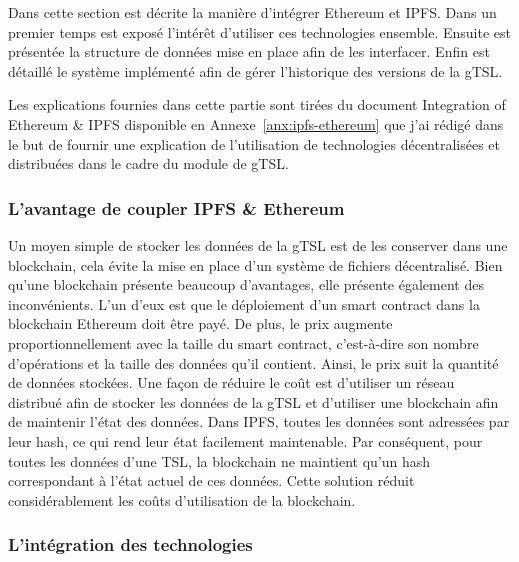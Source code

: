\documentclass{tnreport}
\begin{document}
Dans cette section est décrite la manière d'intégrer Ethereum et IPFS. Dans un premier temps est exposé l'intérêt d'utiliser ces technologies ensemble. Ensuite est présentée la structure de données mise en place afin de les interfacer. Enfin est détaillé le système implémenté afin de gérer l'historique des versions de la gTSL.

Les explications fournies dans cette partie sont tirées du document Integration of Ethereum \& IPFS disponible en Annexe~\ref{anx:ipfs-ethereum} que j'ai rédigé dans le but de fournir une explication de l'utilisation de technologies décentralisées et distribuées dans le cadre du module de gTSL.

\subsubsection{L'avantage de coupler IPFS \& Ethereum}

Un moyen simple de stocker les données de la gTSL est de les conserver dans une blockchain, cela évite la mise en place d'un système de fichiers décentralisé. 
Bien qu'une blockchain présente beaucoup d'avantages, elle présente également des inconvénients.
L'un d'eux est que le déploiement d'un smart contract dans la blockchain Ethereum doit être payé.
De plus, le prix augmente proportionnellement avec la taille du smart contract, c'est-à-dire son nombre d'opérations et la taille des données qu'il contient.
Ainsi, le prix suit la quantité de données stockées.
Une façon de réduire le coût est d'utiliser un réseau distribué afin de stocker les données de la gTSL et d'utiliser une blockchain afin de maintenir l'état des données.
Dans IPFS, toutes les données sont adressées par leur hash, ce qui rend leur état facilement maintenable. Par conséquent, pour toutes les données d'une TSL, la blockchain ne maintient qu'un hash correspondant à l'état actuel de ces données. Cette solution réduit considérablement les coûts d'utilisation de la blockchain.

\subsubsection{L'intégration des technologies}
\end{document}
